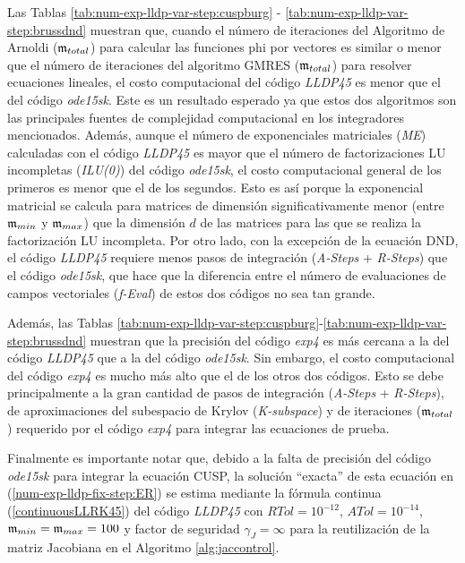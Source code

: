 Las Tablas \ref{tab:num-exp-lldp-var-step:cuspburg} - \ref{tab:num-exp-lldp-var-step:brussdnd} muestran que, cuando el número de iteraciones del Algoritmo de Arnoldi ($\mathfrak{m}_{total}$) para calcular las funciones phi por vectores es similar o menor que el número de iteraciones del algoritmo GMRES ($\mathfrak{m}_{total}$) para resolver ecuaciones lineales, el costo computacional del código \emph{LLDP45} es menor que el del código \emph{ode15sk}. Este es un resultado esperado ya que estos dos algoritmos son las principales fuentes de complejidad computacional en los integradores mencionados. Además, aunque el número de exponenciales matriciales (\textit{ME}) calculadas con el código \emph{LLDP45} es mayor que el número de factorizaciones LU incompletas (\textit{ILU(0)}) del código \emph{ode15sk}, el costo computacional general de los primeros es menor que el de los segundos. Esto es así porque la exponencial matricial se calcula para matrices de dimensión significativamente menor (entre $\mathfrak{m}_{min}$ y $\mathfrak{m}_{max}$) que la dimensión $d$ de las matrices para las que se realiza la factorización LU incompleta. Por otro lado, con la excepción de la ecuación DND, el código \emph{LLDP45} requiere menos pasos de integración (\textit{A-Steps} + \textit{R-Steps}) que el código \emph{ode15sk}, que hace que la diferencia entre el número de evaluaciones de campos vectoriales (\textit{f-Eval}) de estos dos códigos no sea tan grande.

Además, las Tablas \ref{tab:num-exp-lldp-var-step:cuspburg}-\ref{tab:num-exp-lldp-var-step:brussdnd} muestran que la precisión del código \emph{exp4} es más cercana a la del código \emph{LLDP45} que a la del código \emph{ode15sk}. Sin embargo, el costo computacional del código \emph{exp4} es mucho más alto que el de los otros dos códigos. Esto se debe principalmente a la gran cantidad de pasos de integración (\textit{A-Steps} + \textit{R-Steps}), de aproximaciones del subespacio de Krylov (\textit{K-subspace}) y de iteraciones ($\mathfrak{m}_ {total}$) requerido por el código \emph{exp4} para integrar las ecuaciones de prueba.

Finalmente es importante notar que, debido a la falta de precisión del código \emph{ode15sk} para integrar la ecuación CUSP, la solución ``exacta'' de esta ecuación en (\ref{num-exp-lldp-fix-step:ER}) se estima mediante la fórmula continua (\ref{continuousLLRK45}) del código \emph{LLDP45} con $RTol = 10^{-12}$, $ATol = 10^{-14}$, $\mathfrak{m}_{min} = \mathfrak{m}_{max} = 100$ y factor de seguridad $\gamma_J=\infty$ para la reutilización de la matriz Jacobiana en el Algoritmo \ref{alg:jaccontrol}.